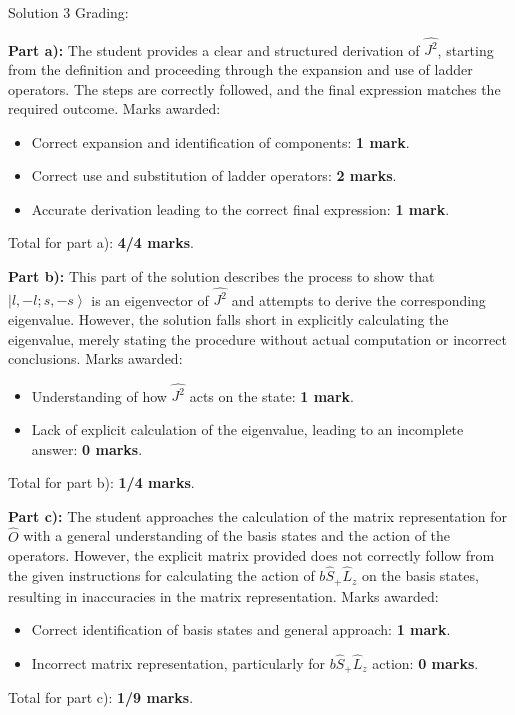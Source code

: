 \documentclass[a4paper,11pt]{article}
\begin{document}
\hrulefill

Solution 3 Grading:

\textbf{Part a):} The student provides a clear and structured derivation of \(\hat{J^{2}}\), starting from the definition and proceeding through the expansion and use of ladder operators. The steps are correctly followed, and the final expression matches the required outcome. Marks awarded:
\begin{itemize}
    \item Correct expansion and identification of components: \textbf{1 mark}.
    \item Correct use and substitution of ladder operators: \textbf{2 marks}.
    \item Accurate derivation leading to the correct final expression: \textbf{1 mark}.
\end{itemize}
Total for part a): \textbf{4/4 marks}.

\textbf{Part b):} This part of the solution describes the process to show that \(\left|l, -l; s, -s \right>\) is an eigenvector of \(\hat{J^{2}}\) and attempts to derive the corresponding eigenvalue. However, the solution falls short in explicitly calculating the eigenvalue, merely stating the procedure without actual computation or incorrect conclusions. Marks awarded:
\begin{itemize}
    \item Understanding of how \(\hat{J^{2}}\) acts on the state: \textbf{1 mark}.
    \item Lack of explicit calculation of the eigenvalue, leading to an incomplete answer: \textbf{0 marks}.
\end{itemize}
Total for part b): \textbf{1/4 marks}.

\textbf{Part c):} The student approaches the calculation of the matrix representation for \(\hat{O}\) with a general understanding of the basis states and the action of the operators. However, the explicit matrix provided does not correctly follow from the given instructions for calculating the action of \(b\hat{S}_{+}\hat{L}_{z}\) on the basis states, resulting in inaccuracies in the matrix representation. Marks awarded:
\begin{itemize}
    \item Correct identification of basis states and general approach: \textbf{1 mark}.
    \item Incorrect matrix representation, particularly for \(b\hat{S}_{+}\hat{L}_{z}\) action: \textbf{0 marks}.
\end{itemize}
Total for part c): \textbf{1/9 marks}.
\end{document}
